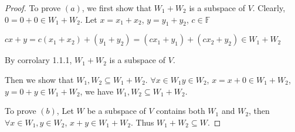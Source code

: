 \begin{proof}
	To prove $(a)$, we first show that $W_{1}+W_{2}$ is a subspace of $V$. Clearly, $0=0+0 \in W_{1}+W_{2}$. Let $x=x_{1}+x_{2}$, $y=y_{1}+y_{2}$, $c \in \mathbb{F}$

$cx+y=c(x_{1}+x_{2})+(y_{1}+y_{2})=(cx_{1}+y_{1})+(cx_{2}+y_{2}) \in W_{1}+W_{2}$

By corrolary 1.1.1, $W_{1}+W_{2}$ is a subspace of $V$.

Then we show that $W_{1}, W_{2} \subseteq W_{1}+W_{2}$. $\forall x \in W_{1} y \in W_{2}$, $x=x+0 \in W_{1}+W_{2}$, $y=0+y \in W_{1}+W_{2}$, we have $W_{1}, W_{2} \subseteq W_{1}+W_{2}$.

To prove $(b)$, Let $W$ be a subspace of $V$ contains both $W_{1}$ and $W_{2}$, then $\forall x \in W_{1} , y \in W_{2}$, $x+y \in W_{1}+W_{2}$. Thus $W_{1}+W_{2} \subseteq W$. 
\end{proof}
